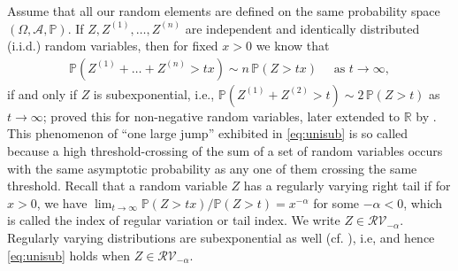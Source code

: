 \documentclass[aos]{imsart}
\numberwithin{equation}{section}
\theoremstyle{plain} %
\theoremstyle{remark}
\renewcommand\P{\mathbb{P}}
\newcommand{\R}{\mathbb{R}}
\def\RV{\mathcal{RV}}
\begin{document}
Assume that all our random elements are defined on the same probability space $(\Omega,\mathcal{A},\P)$. If $Z,Z^{(1)},\ldots, Z^{(n)}$ are independent and identically distributed (i.i.d.) random variables, then  for fixed $x>0$ we know that
\begin{align}\label{eq:unisub}
 \P(Z^{(1)}+\ldots+Z^{(n)}>tx) \sim n\,\P(Z>tx) %
 \quad \text{ as }t\to\infty,
 \end{align}
  if and only if $Z$ is subexponential, i.e.,  $\P(Z^{(1)}+Z^{(2)}>t) \sim 2\,\P(Z>t)$ as $t\to \infty$; \citet{chistyakov:1964} proved this for non-negative random variables, later extended to $\R$ by \citet{willekens:1986}. This phenomenon  of ``one large jump'' exhibited in \eqref{eq:unisub} is so called because a high threshold-crossing of the sum of a set of random variables occurs with the same asymptotic probability as any one of them crossing the same threshold.
  Recall that a random variable $Z$ has a regularly varying right tail if for $x>0$, we have $\lim_{t\to\infty} \P(Z>tx)/\P(Z>t) = x^{-\alpha}$ for some  $-\alpha<0$, which is called the index of regular variation or tail index. We write $Z\in\RV_{-\alpha}$. Regularly varying distributions are subexponential as well (cf. \cite{teugels:1975}), i.e, and hence \eqref{eq:unisub} holds when $Z\in\RV_{-\alpha}$.
\end{document}
